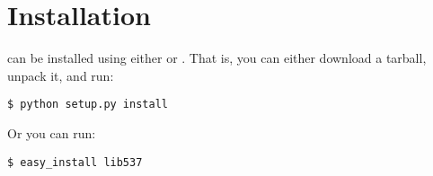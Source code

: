\chapter{Installation \label{installation}}

 can be installed using either  or
. That is, you can either download a tarball, unpack it, and
run:

\begin{verbatim}
$ python setup.py install
\end{verbatim}

Or you can run:

\begin{verbatim}
$ easy_install lib537
\end{verbatim}
